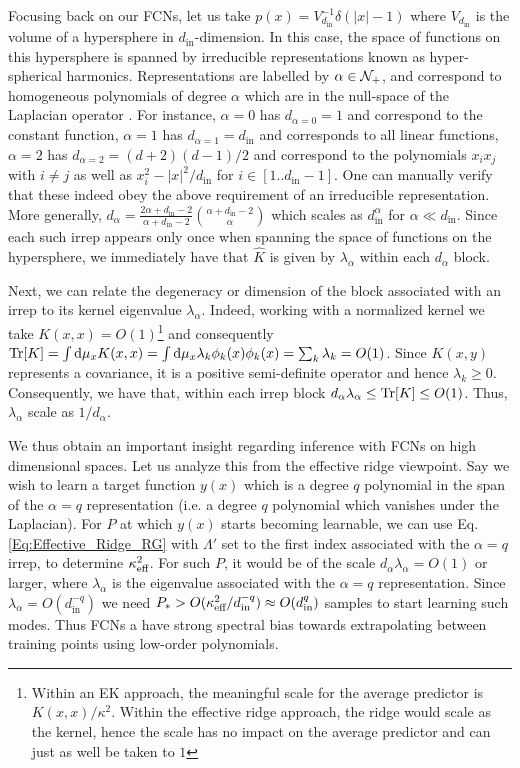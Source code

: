 Focusing back on our FCNs, let us take $p(x)=V_{d_{\text{in}}}^{-1}\delta(|x|-1)$ where $V_{d_{\text{in}}}$ is the volume of a hypersphere in $d_{\text{in}}$-dimension. In this case, the space of functions on this hypersphere is spanned by irreducible representations known as hyper-spherical harmonics. Representations are labelled by $\alpha \in {\cal N}_+$, and correspond to homogeneous polynomials of degree $\alpha$ which are in the null-space of the Laplacian operator \citep{Frye2012}. For instance, $\alpha=0$ has $d_{\alpha=0}=1$ and correspond to the constant function, $\alpha=1$ has $d_{\alpha=1}=d_{\text{in}}$ and corresponds to all linear functions, $\alpha=2$ has $d_{\alpha=2}=(d+2)(d-1)/2$ and correspond to the polynomials $x_i x_j$ with $i \neq j$ as well as $x^2_i-|x|^2/d_{\text{in}}$ for $i \in [1..d_{\text{in}}-1]$. One can manually verify that these indeed obey the above requirement of an irreducible representation. More generally, $d_{\alpha}=\frac{2\alpha+d_{\text{in}}-2}{\alpha+d_{\text{in}}-2}\binom{\alpha+d_{\text{in}}-2}{\alpha}$ which scales as $d_{\text{in}}^{\alpha}$ for $\alpha \ll d_{\text{in}}$. Since each such irrep appears only once when spanning the space of functions on the hypersphere, we immediately have that $\hat{K}$ is given by $\lambda_{\alpha}$ within each $d_{\alpha}$ block. 

Next, we can relate the degeneracy or dimension of the block associated with an irrep to its kernel eigenvalue $\lambda_{\alpha}$. Indeed, working with a normalized kernel we take $K(x,x)=O(1)$\footnote{Within an EK approach, the meaningful scale for the average predictor is $K(x,x)/\kappa^2$. Within the effective ridge approach, the ridge would scale as the kernel, hence the scale has no impact on the average predictor and can just as well be taken to $1$} and consequently $\text{Tr}[K]=\int \text{d} \mu_x K(x,x)=\int \text{d} \mu_x \lambda_k \phi_k(x) \phi_k(x)=\sum_k \lambda_k = O(1)$. Since $K(x,y)$ represents a covariance, it is a positive semi-definite operator and hence $\lambda_k \geq 0$. Consequently, we have that, within each irrep block $d_{\alpha} \lambda_{\alpha}\leq \text{Tr}[K] \leq O(1)$. Thus, $\lambda_{\alpha}$ scale as $1/d_{\alpha}$. 

We thus obtain an important insight regarding inference with FCNs on high dimensional spaces. Let us analyze this from the effective ridge viewpoint. Say we wish to learn a target function $y(x)$ which is a degree $q$ polynomial in the span of the $\alpha=q$ representation (i.e. a degree $q$ polynomial which vanishes under the Laplacian). For $P$ at which $y(x)$ starts becoming learnable, we can use Eq. \ref{Eq:Effective_Ridge_RG} with $\Lambda'$ set to the first index associated with the $\alpha=q$ irrep, to determine $\kappa_{\text{eff}}^2$. For such $P$, it would be of the scale $d_{\alpha}\lambda_{\alpha}=O(1)$ or larger, where $\lambda_{\alpha}$ is the eigenvalue associated with the $\alpha=q$ representation. Since $\lambda_{\alpha}=O(d_{\text{in}}^{-q})$ we need $P_* > O(\kappa_{\text{eff}}^2/d_{\text{in}}^{-q}) \approx O(d_{\text{in}}^q)$ samples to start learning such modes. Thus FCNs a have strong spectral bias towards extrapolating between training points using low-order polynomials.

